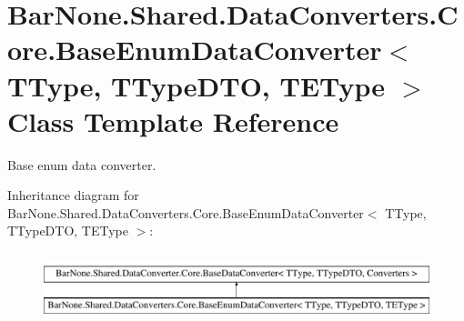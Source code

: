 \hypertarget{class_bar_none_1_1_shared_1_1_data_converters_1_1_core_1_1_base_enum_data_converter}{}\section{Bar\+None.\+Shared.\+Data\+Converters.\+Core.\+Base\+Enum\+Data\+Converter$<$ T\+Type, T\+Type\+D\+TO, T\+E\+Type $>$ Class Template Reference}
\label{class_bar_none_1_1_shared_1_1_data_converters_1_1_core_1_1_base_enum_data_converter}


Base enum data converter.  


Inheritance diagram for Bar\+None.\+Shared.\+Data\+Converters.\+Core.\+Base\+Enum\+Data\+Converter$<$ T\+Type, T\+Type\+D\+TO, T\+E\+Type $>$\+:\begin{figure}[H]
\begin{center}
\leavevmode
\includegraphics[height=1.975309cm]{class_bar_none_1_1_shared_1_1_data_converters_1_1_core_1_1_base_enum_data_converter}
\end{center}
\end{figure}
